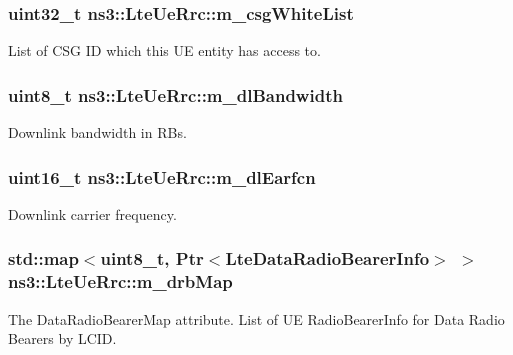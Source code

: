 \subsubsection[{\texorpdfstring{m\+\_\+csg\+White\+List}{m_csgWhiteList}}]{\setlength{\rightskip}{0pt plus 5cm}uint32\+\_\+t ns3\+::\+Lte\+Ue\+Rrc\+::m\+\_\+csg\+White\+List\hspace{0.3cm}{\ttfamily [private]}}\hypertarget{classns3_1_1LteUeRrc_ac893aad87d7e5a34006b3c4f5a6f89b7}{}\label{classns3_1_1LteUeRrc_ac893aad87d7e5a34006b3c4f5a6f89b7}


List of C\+SG ID which this UE entity has access to. 

\subsubsection[{\texorpdfstring{m\+\_\+dl\+Bandwidth}{m_dlBandwidth}}]{\setlength{\rightskip}{0pt plus 5cm}uint8\+\_\+t ns3\+::\+Lte\+Ue\+Rrc\+::m\+\_\+dl\+Bandwidth\hspace{0.3cm}{\ttfamily [private]}}\hypertarget{classns3_1_1LteUeRrc_a75859752f8175432e4a23b2d7079bfde}{}\label{classns3_1_1LteUeRrc_a75859752f8175432e4a23b2d7079bfde}
Downlink bandwidth in R\+Bs. 
\subsubsection[{\texorpdfstring{m\+\_\+dl\+Earfcn}{m_dlEarfcn}}]{\setlength{\rightskip}{0pt plus 5cm}uint16\+\_\+t ns3\+::\+Lte\+Ue\+Rrc\+::m\+\_\+dl\+Earfcn\hspace{0.3cm}{\ttfamily [private]}}\hypertarget{classns3_1_1LteUeRrc_af8019b7697bea32f260e8dbb7668730f}{}\label{classns3_1_1LteUeRrc_af8019b7697bea32f260e8dbb7668730f}
Downlink carrier frequency. 
\subsubsection[{\texorpdfstring{m\+\_\+drb\+Map}{m_drbMap}}]{\setlength{\rightskip}{0pt plus 5cm}std\+::map$<$uint8\+\_\+t, {\bf Ptr}$<${\bf Lte\+Data\+Radio\+Bearer\+Info}$>$ $>$ ns3\+::\+Lte\+Ue\+Rrc\+::m\+\_\+drb\+Map\hspace{0.3cm}{\ttfamily [private]}}\hypertarget{classns3_1_1LteUeRrc_aa85c5bdde73c2072b2b3053e629bdce0}{}\label{classns3_1_1LteUeRrc_aa85c5bdde73c2072b2b3053e629bdce0}
The {\ttfamily Data\+Radio\+Bearer\+Map} attribute. List of UE Radio\+Bearer\+Info for Data Radio Bearers by L\+C\+ID. 
